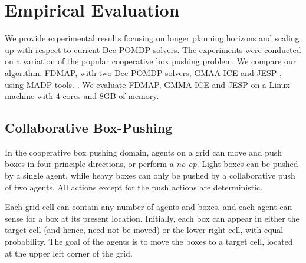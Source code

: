 \documentclass[letterpaper]{article} %
\theoremstyle{definition}
\newcommand{\commentout}[1]{}
\newcommand{\cbp}[0]{Collaborative Box-Pushing}
\begin{document}
\commentout{
\begin{algorithm}
\caption{Alignment Iteration}
\begin{algorithmic}[tbph]
\State Input: PolicyGraphs $G_1, ..., G_M$
\For{$G_i,  i\in\{1, ..., M\}$}
	\State {$\mathit{NoopsReqs} \gets \mathit{VertexToIntMapping}$}
      \State {$\mathit{CurrBFS} \gets \Call{BFS}{G_i}$}
      \While {$\mathit{CurrBFS.queue}$ is not empty}
	\State {$v \gets \mathit{CurrBFS.queue.pop}$}
	\State {$a \gets v.action$}
	\If {$a$ is public action}
	\State {$\mathit{identifier} \gets \Call{GetIdentifier}{v}$}
	\State {$\mathit{MaxNoop} \gets 0$}
	\For {$G_j,  j\in\{1, ..., M\}\setminus\{i\}$}
	\State {$\mathit{CurrNoop} \gets \Call{NoopReq}{G_j, \mathit{identifier}}$}
	\State {$\mathit{MaxNoop} \gets max(\mathit{MaxNoop}, \mathit{CurrNoop})$}
	\EndFor
	\State {$\mathit{NoopsReqs}[v] \gets \mathit{MaxNoop} - \mathit{CompensationTerm}$}
	\EndIf
	\EndWhile
	\State {$G_i' \gets \Call{AddNoops}{G_i, \mathit{NoopsReqs}}$}
\EndFor
\State {return $G_1', ..., G_M'$}
\end{algorithmic}
\end{algorithm}
}

\section{Empirical Evaluation}

We provide experimental results focusing on longer planning horizons and scaling up with respect to current Dec-POMDP solvers.
The experiments were conducted on a variation of the popular cooperative box pushing problem.
We compare our algorithm, FDMAP, with two Dec-POMDP solvers, GMAA-ICE \cite{GMAAICE} and JESP \cite{JESP}, using MADP-tools. \cite{MADP}.
We evaluate FDMAP, GMMA-ICE and JESP on a Linux machine with 4 cores and 8GB of memory.


\subsection{\cbp}

In the cooperative box pushing domain, agents on a grid can move and push boxes in  four principle directions, 
or perform a {\em no-op}. Light boxes can be pushed by a single agent, while heavy boxes can only be pushed by a collaborative push of two agents. 
All actions except for the push actions are deterministic.

Each grid cell can contain any number of agents and boxes, and  each agent can sense for a box at its present location.
Initially, each box can appear in either the target cell (and hence, need not be moved) or the lower right cell, with equal probability.
The goal of the agents is to move the boxes to a target cell, located at the upper left corner of the grid.
 
\end{document}
